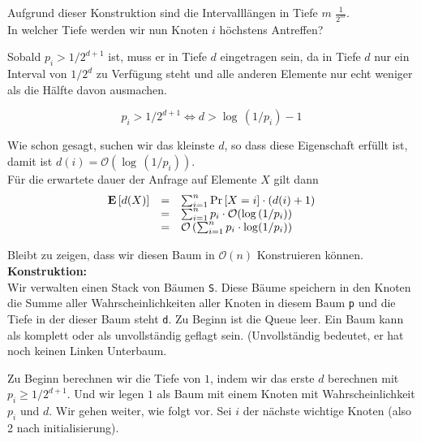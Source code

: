 \documentclass[11pt,a4paper,ngerman]{article}
\newcommand{\erw}[1]{\text{\bfseries E} \left[ #1 \right]}
\newcommand{\prob}[1]{\text{Pr}\left[ #1 \right]}
\begin{document}
Aufgrund dieser Konstruktion sind die Intervalllängen in Tiefe $m$ $\frac{1}{2^m}$.\\

In welcher Tiefe werden wir nun Knoten $i$ höchstens Antreffen?

Sobald $p_i > 1 / 2^{d+1}$ ist, muss er in Tiefe $d$ eingetragen sein, da in Tiefe $d$ nur ein Interval von $1 / 2^{d}$ zu Verfügung steht und
alle anderen Elemente nur echt weniger als die Hälfte davon ausmachen.

$$ p_i > 1/2^{d+1} \Leftrightarrow d > \log \, (1/ p_i) - 1$$

Wie schon gesagt, suchen wir das kleinste $d$, so dass diese Eigenschaft erfüllt ist, damit ist $d(i) = \mathcal{O}(\log \, (1/ p_i))$.\\

Für die erwartete dauer der Anfrage auf Elemente $X$ gilt dann 
$$\begin{array}{rcl}
	\erw{d(X)} &=& \sum_{i=1}^n \prob{X=i}\cdot (d(i) + 1)\\
		  &=& \sum_{i=1}^n p_i \cdot \mathcal{O}(\log \, (1/p_i))\\
		&=& \mathcal{O}\left( \sum_{i=1}^n p_i \cdot \log (1 / p_i)\right)
\end{array}$$

Bleibt zu zeigen, dass wir diesen Baum in $\mathcal{O}(n)$ Konstruieren können.\\

\noindent\textbf{Konstruktion:}\\
Wir verwalten einen Stack von Bäumen \lstinline|S|. Diese Bäume speichern in den Knoten die Summe aller Wahrscheinlichkeiten aller Knoten in diesem Baum \lstinline|p| und
die Tiefe in der dieser Baum steht \lstinline|d|. Zu Beginn ist die Queue leer. Ein Baum kann als komplett oder als unvollständig geflagt sein. (Unvollständig bedeutet, er hat noch keinen Linken Unterbaum.

Zu Beginn berechnen wir die Tiefe von $1$, indem wir das erste $d$ berechnen mit $p_i \geq 1/2^{d+1}$. Und wir legen $1$ als Baum mit einem Knoten
mit Wahrscheinlichkeit $p_i$ und $d$. Wir gehen weiter, wie folgt vor. Sei $i$ der nächste wichtige Knoten (also 2 nach initialisierung).
\end{document}
